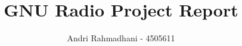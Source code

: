\documentclass{tudelft-report}
\begin{document}
\frontmatter

\title[ET4394 Wireless Networking]{GNU Radio Project Report}
\author{Andri Rahmadhani - 4505611}
\makecover

%

%

\tableofcontents

\mainmatter








%

\renewcommand\bibname{References}

\end{document}
